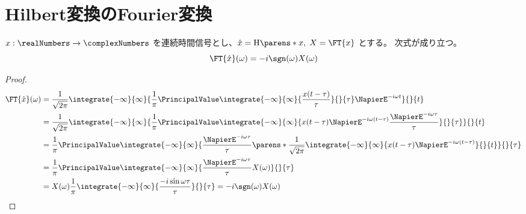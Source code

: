     \chapter{Hilbert変換のFourier変換}
        \begin{shadebox}
            $x:\realNumbers\to\complexNumbers$ を連続時間信号とし、$\hat{x} = \HilbertTransform{x},\;X = \FT{x}$ とする。
            次式が成り立つ。
            \[ \FT{\hat{x}}(\omega) = -i\sgn(\omega)X(\omega) \]
        \end{shadebox}
        \begin{proof}
            \begin{align*}
                \FT{\hat{x}}(\omega) &= \frac{1}{\sqrt{2\pi}}\integrate{-\infty}{\infty}{\frac{1}{\pi}\PrincipalValue\integrate{-\infty}{\infty}{\frac{x(t-\tau)}{\tau}}{}{\tau}\NapierE^{-i\omega t}}{}{t} \\
                &= \frac{1}{\sqrt{2\pi}}\integrate{-\infty}{\infty}{\frac{1}{\pi}\PrincipalValue\integrate{-\infty}{\infty}{x(t-\tau)\NapierE^{-i\omega(t-\tau)}\frac{\NapierE^{-i\omega \tau}}{\tau}}{}{\tau}}{}{t} \\
                &= \frac{1}{\pi}\PrincipalValue\integrate{-\infty}{\infty}{\frac{\NapierE^{-i\omega \tau}}{\tau}\parens*{\frac{1}{\sqrt{2\pi}}\integrate{-\infty}{\infty}{x(t-\tau)\NapierE^{-i\omega(t-\tau)}}{}{t}}}{}{\tau} \\
                &= \frac{1}{\pi}\PrincipalValue\integrate{-\infty}{\infty}{\frac{\NapierE^{-i\omega \tau}}{\tau}X(\omega)}{}{\tau} \\
                &= X(\omega)\frac{1}{\pi}\integrate{-\infty}{\infty}{\frac{-i\sin\omega\tau}{\tau}}{}{\tau} = -i\sgn(\omega)X(\omega)
            \end{align*}
        \end{proof}